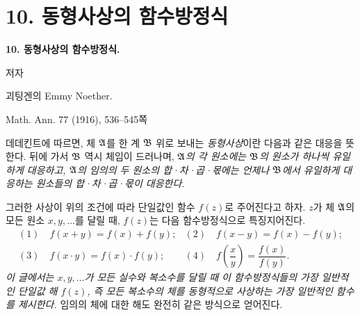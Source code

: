 
\section*{10. 동형사상의 함수방정식}
\begin{center}
{\Large\bfseries 10. 동형사상의 함수방정식.}\par
\vspace{0.75em}
저자\par
\vspace{0.75em}
괴팅겐의 Emmy Noether.\par
\vspace{1em}
Math. Ann. 77 (1916), 536--545쪽
\end{center}

\vspace{3em}

데데킨트에 따르면, 체 \(\mathfrak A\)를 한 계 \(\mathfrak B\) 위로 보내는 \emph{동형사상}이란 다음과 같은 대응을 뜻한다. 뒤에 가서 \(\mathfrak B\) 역시 체임이 드러나며, \emph{\(\mathfrak A\)의 각 원소에는 \(\mathfrak B\)의 원소가 하나씩 유일하게 대응하고, \(\mathfrak A\)의 임의의 두 원소의 합·차·곱·몫에는 언제나 \(\mathfrak B\)에서 유일하게 대응하는 원소들의 합·차·곱·몫이 대응한다.}

그러한 사상이 위의 조건에 따라 단일값인 함수 \(f(z)\)로 주어진다고 하자. \(z\)가 체 \(\mathfrak A\)의 모든 원소 \(x,y,\ldots\)를 달릴 때, \(f(z)\)는 다음 함수방정식으로 특징지어진다.
\[
\begin{array}{ll}
(1)\quad f(x+y)=f(x)+f(y); & (2)\quad f(x-y)=f(x)-f(y);\\[0.45em]
(3)\quad f(x\cdot y)=f(x)\cdot f(y); & (4)\quad f\!\left(\dfrac{x}{y}\right)=\dfrac{f(x)}{f(y)}.
\end{array}
\]
\emph{이 글에서는 \(x,y,\ldots\)가 모든 실수와 복소수를 달릴 때 이 함수방정식들의 가장 일반적인 단일값 해 \(f(z)\), 즉 모든 복소수의 체를 동형적으로 사상하는 가장 일반적인 함수를 제시한다.} 임의의 체에 대한 해도 완전히 같은 방식으로 얻어진다.

